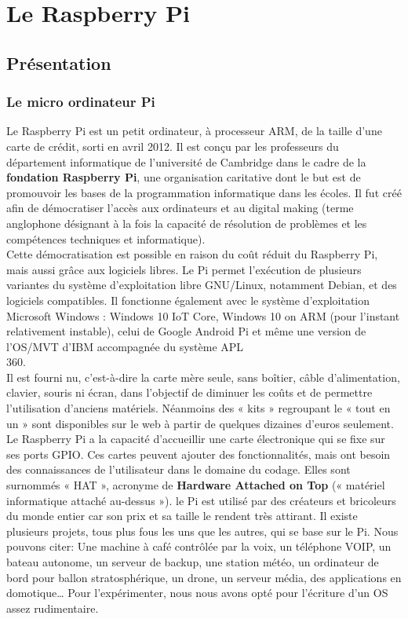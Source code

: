 \documentclass[12pt,a4paper,oneside]{book}
\begin{document}
	\mainmatter
	
	\chapter{Le Raspberry Pi}
	\section{Présentation}
	\subsection{Le micro ordinateur Pi}
	Le Raspberry Pi est un petit ordinateur, à processeur ARM, de la taille d'une carte de crédit, sorti en avril 2012. Il est conçu par les professeurs du département informatique de l'université de Cambridge dans le cadre de la \textbf{fondation Raspberry Pi}, une organisation caritative dont le but est de promouvoir les bases de la programmation informatique dans les écoles. Il fut créé afin de démocratiser l'accès aux ordinateurs et au digital making (terme anglophone désignant à la fois la capacité de résolution de problèmes et les compétences techniques et informatique).\\
	Cette démocratisation est possible en raison du coût réduit du Raspberry Pi, mais aussi grâce aux logiciels libres. Le Pi permet l'exécution de plusieurs variantes du système d'exploitation libre GNU/Linux, notamment Debian, et des logiciels compatibles. Il fonctionne également avec le système d'exploitation Microsoft Windows : Windows 10 IoT Core, Windows 10 on ARM (pour l'instant relativement instable), celui de Google Android Pi et même une version de l'OS/MVT d'IBM accompagnée du système APL\\360. \\
	Il est fourni nu, c'est-à-dire la carte mère seule, sans boîtier, câble d'alimentation, clavier, souris ni écran, dans l'objectif de diminuer les coûts et de permettre l'utilisation d'anciens matériels. Néanmoins des « kits » regroupant le « tout en un » sont disponibles sur le web à partir de quelques dizaines d'euros seulement.\\
	
	Le Raspberry Pi a la capacité d'accueillir une carte électronique qui se fixe sur ses ports GPIO. Ces cartes peuvent ajouter des fonctionnalités, mais ont besoin des connaissances de l'utilisateur dans le domaine du codage. Elles sont surnommés « HAT », acronyme de \textbf{Hardware Attached on Top} (« matériel informatique attaché au-dessus »). le Pi est utilisé par des créateurs et bricoleurs du monde entier car son prix et sa taille le rendent très attirant. Il existe plusieurs projets, tous plus fous les uns que les autres, qui se base sur le Pi. Nous pouvons citer: Une machine à café contrôlée par la voix, un téléphone VOIP, un bateau autonome, un serveur de backup, une station météo, un ordinateur de bord pour ballon stratosphérique, un drone, un serveur média, des applications en domotique… Pour l'expérimenter, nous nous avons opté pour l'écriture d'un OS assez rudimentaire.\\
	
\end{document}
